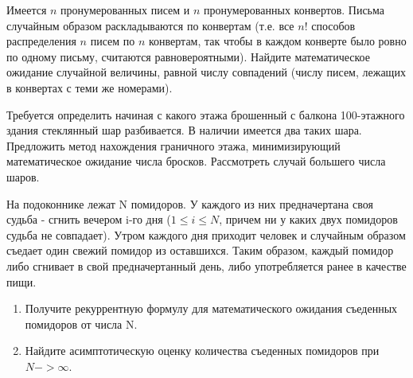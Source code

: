 \begin{problem}
Имеется $n$ пронумерованных писем и $n$ пронумерованных конвертов. Письма случайным образом раскладываются по конвертам (т.е. все $n!$ 
способов распределения $n$ писем по $n$ конвертам, так чтобы в каждом конверте было ровно по одному письму, считаются равновероятными). 
Найдите математическое ожидание случайной величины, равной числу совпадений (числу писем, лежащих в конвертах с теми же номерами). 
\end{problem}

\begin{problem}

Требуется определить начиная с какого этажа брошенный с балкона 100-этажного здания стеклянный шар разбивается. В наличии имеется два таких шара. Предложить метод нахождения граничного этажа, минимизирующий математическое ожидание числа бросков. Рассмотреть случай большего числа шаров.  

\end{problem}

\begin{problem}
На подоконнике лежат N помидоров. У каждого из них предначертана своя судьба - сгнить вечером i-го дня ($1 \leqslant i \leqslant N$, причем ни у каких двух помидоров судьба не совпадает). Утром каждого дня приходит человек и случайным образом съедает один свежий помидор из оставшихся. Таким образом, каждый помидор либо сгнивает в свой предначертанный день, либо употребляется ранее в качестве пищи.

\begin{enumerate}
\item Получите рекуррентную формулу для математического ожидания съеденных помидоров от числа N.
\item Найдите асимптотическую оценку количества съеденных помидоров при $N -> \infty$.
\end{enumerate}

\end{problem}